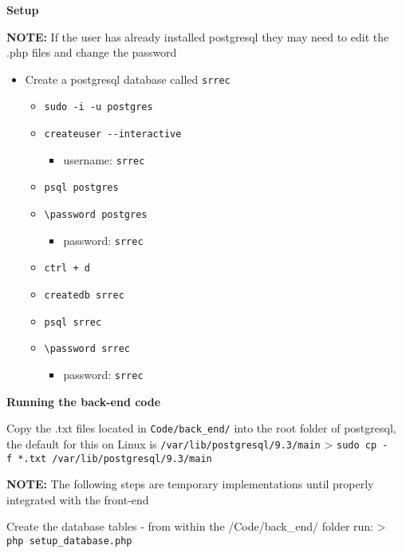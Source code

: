 \documentclass[10pt, a4paper, onecolumn]{scrartcl}
\begin{document}
	\textbf{Setup}
	
	\textbf{NOTE:} If the user has already installed postgresql they may
	need to edit the .php files and change the password
	
	\begin{itemize}[noitemsep]
		\item
		Create a postgresql database called \texttt{srrec}
		
		\begin{itemize}[noitemsep]
			\item
			\texttt{sudo\ -i\ -u\ postgres}
			\item
			\texttt{createuser\ -\/-interactive}
			
			\begin{itemize}[noitemsep]
				\item
				username: \texttt{srrec}
			\end{itemize}
			\item
			\texttt{psql\ postgres}
			\item
			\texttt{\textbackslash{}password\ postgres}
			
			\begin{itemize}[noitemsep]
				\item
				password: \texttt{srrec}
			\end{itemize}
			\item
			\texttt{ctrl\ +\ d}
			\item
			\texttt{createdb\ srrec}
			\item
			\texttt{psql\ srrec}
			\item
			\texttt{\textbackslash{}password\ srrec}
			
			\begin{itemize}[noitemsep]
				\item
				password: \texttt{srrec}
			\end{itemize}
		\end{itemize}
	\end{itemize}
	
	\textbf{Running the back-end code}
	
	Copy the .txt files located in \texttt{Code/back\_end/} into the root
	folder of postgresql, the default for this on Linux is
	\texttt{/var/lib/postgresql/9.3/main} \textgreater{}
	\texttt{sudo\ cp\ -f\ *.txt\ /var/lib/postgresql/9.3/main}
	
	\textbf{NOTE:} The following steps are temporary implementations until
	properly integrated with the front-end
	
	Create the database tables - from within the /Code/back\_end/ folder
	run: \textgreater{} \texttt{php\ setup\_database.php}
	
\end{document}
